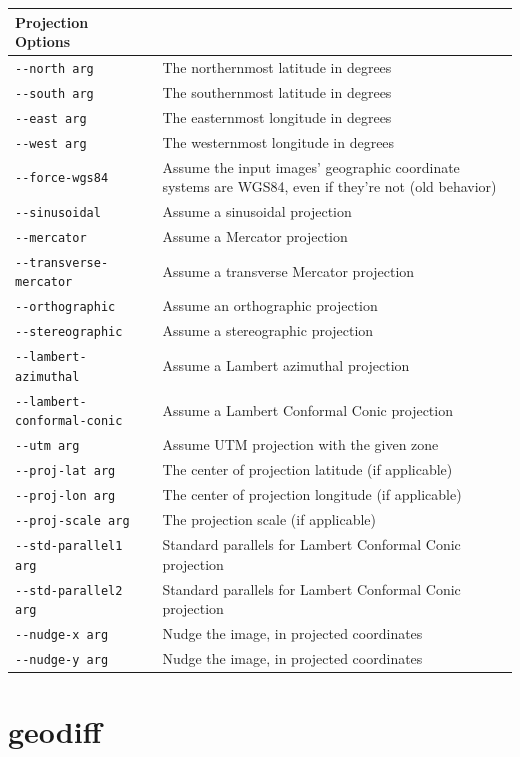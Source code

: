 \begin{longtable}{|l|p{7.5cm}|}
Projection Options\\ \hline
\verb#--north arg# & The northernmost latitude in degrees\\ \hline
\verb#--south arg# & The southernmost latitude in degrees\\ \hline
\verb#--east arg# & The easternmost longitude in degrees\\ \hline
\verb#--west arg# & The westernmost longitude in degrees\\ \hline
\verb#--force-wgs84# & Assume the input images' geographic coordinate systems are WGS84, even if they're not (old behavior)\\ \hline
\verb#--sinusoidal# & Assume a sinusoidal projection\\ \hline
\verb#--mercator# & Assume a Mercator projection\\ \hline
\verb#--transverse-mercator# & Assume a transverse Mercator projection\\ \hline
\verb#--orthographic# & Assume an orthographic projection\\ \hline
\verb#--stereographic# & Assume a stereographic projection\\ \hline
\verb#--lambert-azimuthal# & Assume a Lambert azimuthal projection\\ \hline
\verb#--lambert-conformal-conic# & Assume a Lambert Conformal Conic projection\\ \hline
\verb#--utm arg# & Assume UTM projection with the given zone\\ \hline
\verb#--proj-lat arg# & The center of projection latitude (if applicable)\\ \hline
\verb#--proj-lon arg# & The center of projection longitude (if applicable)\\ \hline
\verb#--proj-scale arg# & The projection scale (if applicable)\\ \hline
\verb#--std-parallel1 arg# & Standard parallels for Lambert Conformal Conic projection\\ \hline
\verb#--std-parallel2 arg# & Standard parallels for Lambert Conformal Conic projection\\ \hline
\verb#--nudge-x arg# & Nudge the image, in projected coordinates\\ \hline
\verb#--nudge-y arg# & Nudge the image, in projected coordinates\\ \hline
\end{longtable}

\section{geodiff}
\label{geodiff}

